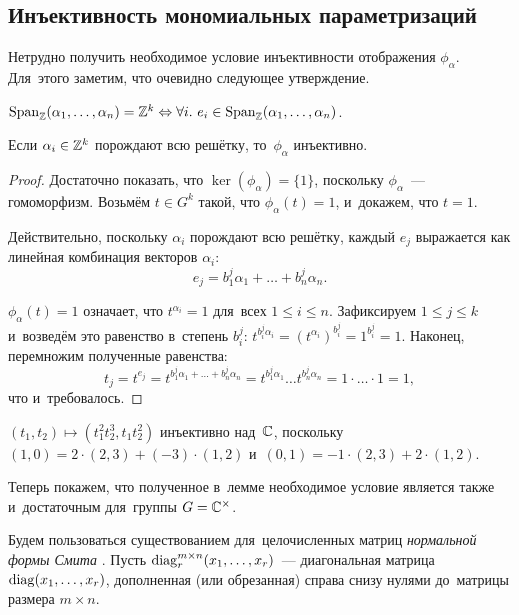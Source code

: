 \subsection{Инъективность мономиальных параметризаций}
Нетрудно получить необходимое условие инъективности отображения $\phi_\alpha$.
Для~этого заметим, что очевидно следующее утверждение.

\begin{statement*}
  $\mathrm{Span}_{\mathbb{Z}}(\alpha_1, \ldots, \alpha_n) = \mathbb{Z}^k \Leftrightarrow \forall i.\ e_i \in \mathrm{Span}_{\mathbb{Z}}(\alpha_1, \ldots, \alpha_n)$.
\end{statement*}

\begin{lemma}
  Если $\alpha_i \in \mathbb{Z}^k$ порождают всю решётку, то~$\phi_\alpha$ инъективно.
\end{lemma}

\begin{proof}
  Достаточно показать, что $\ker(\phi_\alpha) = \{1\}$, поскольку $\phi_\alpha$~— гомоморфизм.
  Возьмём $t \in G^k$ такой, что $\phi_\alpha(t) = 1$, и~докажем, что $t = 1$.

  Действительно, поскольку $\alpha_i$ порождают всю решётку, каждый $e_j$ выражается как линейная комбинация векторов $\alpha_i$:
  \[
    e_j = b^j_1 \alpha_1 + \ldots + b^j_n \alpha_n.
  \]

  $\phi_\alpha(t) = 1$ означает, что $t^{\alpha_i} = 1$ для~всех $1 \leq i \leq n$.
  Зафиксируем $1 \leq j \leq k$ и~возведём это равенство в~степень $b^j_i$: $t^{b^j_i \alpha_i} = (t^{\alpha_i})^{b^j_i} = 1^{b^j_i} = 1$.
  Наконец, перемножим полученные равенства:
  \[
    t_j = t^{e_j} = t^{b^j_1 \alpha_1 + \ldots + b^j_n \alpha_n} = t^{b^j_1 \alpha_1} \ldots t^{b^j_n \alpha_n} = 1 \cdot \ldots \cdot 1 = 1,
  \]
  что и~требовалось.
\end{proof}

\begin{example*}
  $(t_1, t_2) \mapsto (t_1^2 t_2^3, t_1 t_2^2)$ инъективно над~$\mathbb{C}$,
  поскольку $(1, 0) = 2 \cdot (2, 3) + (-3) \cdot (1, 2)$ и~$(0, 1) = -1 \cdot (2, 3) + 2 \cdot (1, 2)$.
\end{example*}

Теперь покажем, что полученное в~лемме необходимое условие является также и~достаточным для~группы $G = \mathbb{C}^\times$.

Будем пользоваться существованием для~целочисленных матриц \textit{нормальной формы Смита} \cite{Smth60}.
Пусть $\mathrm{diag}^{m \times n}_r(x_1, \ldots, x_r)$~— диагональная матрица $\mathrm{diag}(x_1, \ldots, x_r)$,
дополненная (или обрезанная) справа снизу нулями до~матрицы размера $m \times n$.

